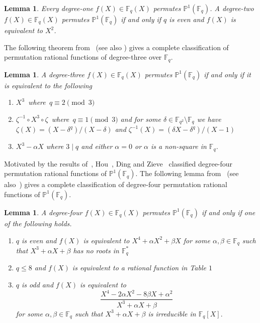 \documentclass[12pt]{amsart}
\newtheorem{lem}[thm]{Lemma}
\numberwithin{equation}{section}
\theoremstyle{definition}
\newcommand{\F}{\mathbb F}
\newcommand{\bP}{\mathbb P}
\begin{document}
\begin{lem}\cite{Ding2020}\label{L20}
Every degree-one $f(X)\in \F_q(X)$ permutes $\bP^1(\F_q)$. A degree-two $f(X)\in \F_q(X)$ permutes $\bP^1(\F_q)$ if and only if $q$ is even and $f(X)$ is equivalent to $X^2$.
\end{lem}
The following theorem from~\cite{Ding2020} (see also \cite{Ferraguti2020,Hou_carlitz}) gives a complete classification of permutation rational functions of degree-three over $\F_q$.
 \begin{lem}\cite[Theorem 1.3]{Ding2020}
\label{T20}
  A degree-three $f(X) \in \F_q(X)$ permutes $\bP^1(\F_q)$ if and only if it is equivalent to the following
  \begin{enumerate}
   \item $X^3$~\mbox{where}~$q\equiv2 \pmod 3$
   \item $\zeta^{-1} \circ X^3 \circ \zeta$~\mbox{where}~$q\equiv1 \pmod 3$ and for some $\delta \in \F_{q^2}\setminus \F_q$ we have $\zeta(X)=(X-\delta^q)/(X-\delta)$ and $ \zeta^{-1}(X)=(\delta X-\delta^q)/(X-1)$
   \item $X^3 -\alpha X$ where $3 \mid q$ and either $\alpha =0$ or $\alpha$ is a non-square in $\F_q$.
  \end{enumerate}
 \end{lem}
 Motivated by the results of~\cite{Ferraguti2020}, Hou~\cite{HouD4}, Ding and Zieve~\cite{Ding2020} classified degree-four permutation rational functions of $\bP^1(\F_q)$. The following lemma from~\cite{Ding2020} (see also~\cite{HouD4}) gives a complete classification of degree-four permutation rational functions of $\bP^1(\F_q)$.
 \begin{lem}\cite[Theorem 1.4]{Ding2020}
 \label{T21}
A degree-four $f(X)\in \F_q(X)$ permutes $\bP^1(\F_q)$ if and only if one of the following holds.
\begin{enumerate}
   \item $q$ is even and $f(X)$ is equivalent to $X^4+\alpha X^2+\beta X$ for some $\alpha, \beta \in \F_q$ such that $X^3+\alpha X+ \beta$ has no roots in $\F_q^*$
   \item $q\leq 8$ and $f(X)$ is equivalent to a rational function in Table $1$~\cite[Page 19]{Ding2020}
   \item $q$ is odd and $f(X)$ is equivalent to $$\frac{X^4-2\alpha X^2-8\beta X+\alpha^2}{X^3+\alpha X+\beta}$$ for some $\alpha, \beta \in \F_q$ such that $X^3+\alpha X+ \beta$ is irreducible in $\F_q[X].$
  \end{enumerate}
\end{lem}
\end{document}
